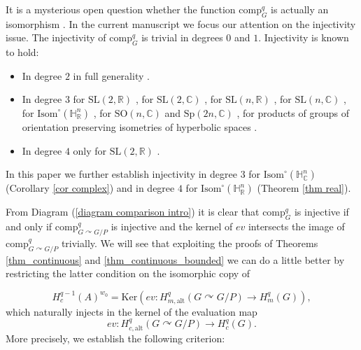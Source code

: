 \documentclass[a4paper]{amsart}
\theoremstyle{definition}
\theoremstyle{remark}
\theoremstyle{TheoremNum}
\begin{document}
It is a mysterious open question whether the function $\mathrm{comp}_G^q$ is actually an isomorphism \cite[Problem A]{MonodICM}. In the current manuscript we focus our attention on the injectivity issue. The injectivity of $\mathrm{comp}^q_G$ is trivial in degrees $0$ and $1$. Injectivity is known to hold:
\begin{itemize}
\item In degree $2$ in full generality \cite{BM99}.
\item In degree $3$ for $\mathrm{SL}(2,\mathbb{R})$ \cite{BuMo2}, for $\mathrm{SL}(2,\mathbb{C})$ \cite{Bloch}, for $\mathrm{SL}(n,\mathbb{R})$ \cite{MonodSLn}, for $\mathrm{SL}(n,\mathbb{C})$ \cite{MonodSLn,BBI18}, for $\mathrm{Isom}^\circ(\mathbb{H}^n_{\mathbb{R}})$ \cite{Pieters}, for $\mathrm{SO}(n,\mathbb{C})$ and $\mathrm{Sp}(2n,\mathbb{C})$ \cite{DLC}, for products of groups of orientation preserving isometries of hyperbolic spaces \cite{BucSavExp}. 
\item In degree $4$ only for $\mathrm{SL}(2,\mathbb{R})$ \cite{HO}.
\end{itemize} 

In this paper we further establish injectivity in degree $3$ for $\mathrm{Isom}^\circ(\mathbb{H}^n_\mathbb{C})$ (Corollary \ref{cor complex}) and in degree $4$ for  $\mathrm{Isom}^\circ(\mathbb{H}^n_\mathbb{R})$ (Theorem \ref{thm real}). 


From Diagram (\ref{diagram comparison intro}) it is clear that $\mathrm{comp}^q_G$ is injective if and only if $\mathrm{comp}^q_{G \curvearrowright G/P}$ is injective and the kernel of $ev$ intersects the image of $\mathrm{comp}^q_{G \curvearrowright G/P}$ trivially. We will see that exploiting the proofs of Theorems \ref{thm_continuous} and \ref{thm_continuous_bounded} we can do a little better by restricting the latter condition on the  isomorphic copy of 

$$H^{q-1}_c(A)^{w_0}=\mathrm{Ker}(ev: H^q_{m,\mathrm{alt}}(G \curvearrowright G/P)\longrightarrow H^q_{m}(G)),$$
which naturally injects in the kernel of the evaluation map  
$$ev: H^q_{c,\mathrm{alt}}(G \curvearrowright G/P)\longrightarrow H^q_{c}(G).$$
More precisely, we establish the following criterion: 
\end{document}
